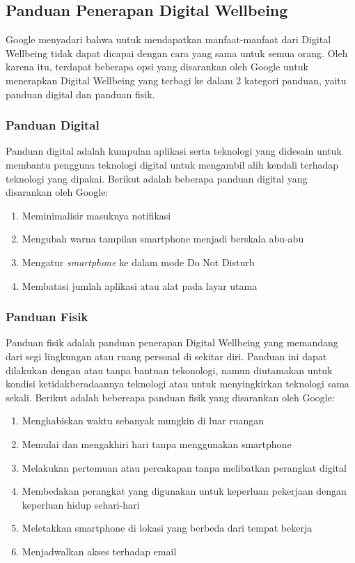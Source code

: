   \subsection{Panduan Penerapan Digital Wellbeing}
  
  Google menyadari bahwa untuk mendapatkan manfaat-manfaat dari Digital Wellbeing tidak dapat dicapai dengan cara yang sama untuk semua orang. Oleh karena itu, terdapat beberapa opsi yang disarankan oleh Google untuk menerapkan Digital Wellbeing yang terbagi ke dalam 2 kategori panduan, yaitu panduan digital dan panduan fisik.
  
  \subsubsection{Panduan Digital}
  
  Panduan digital adalah kumpulan aplikasi serta teknologi yang didesain untuk membantu pengguna teknologi digital untuk mengambil alih kendali terhadap teknologi yang dipakai. Berikut adalah beberapa panduan digital yang disarankan oleh Google:
  
  \begin{enumerate}
    \item Meminimalisir masuknya notifikasi
    \item Mengubah warna tampilan smartphone menjadi berskala abu-abu
    \item Mengatur \textit{smartphone} ke dalam mode Do Not Disturb
    \item Membatasi jumlah aplikasi atau alat pada layar utama
  \end{enumerate}

  \subsubsection{Panduan Fisik}

  Panduan fisik adalah panduan penerapan Digital Wellbeing yang memandang dari segi lingkungan atau ruang personal di sekitar diri. Panduan ini dapat dilakukan dengan atau tanpa bantuan tekonologi, namun diutamakan untuk kondisi ketidakberadaannya teknologi atau untuk menyingkirkan teknologi sama sekali. Berikut adalah bebereapa panduan fisik yang disarankan oleh Google:

  \begin{enumerate}
    \item Menghabiskan waktu sebanyak mungkin di luar ruangan
    \item Memulai dan mengakhiri hari tanpa menggunakan smartphone
    \item Melakukan pertemuan atau percakapan tanpa melibatkan perangkat digital
    \item Membedakan perangkat yang digunakan untuk keperluan pekerjaan dengan keperluan hidup sehari-hari
    \item Meletakkan smartphone di lokasi yang berbeda dari tempat bekerja
    \item Menjadwalkan akses terhadap email 
  \end{enumerate}


